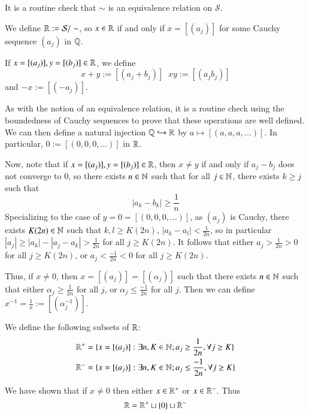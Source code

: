 It is a routine check that $\sim$ is an equivalence relation on $\mathcal{S}$. 

\begin{definition}
    We define $\mathbb R := \mathcal{S}/\sim$, so $x \in \mathbb R$ if and only if $x = [(a_j)]$ for some Cauchy sequence $(a_j)$ in $\mathbb Q$.
\end{definition}

\begin{definition}
    If $x = [(a_j)], y = [(b_j)] \in \mathbb R$, we define $$x+y := [(a_j+b_j)]\;\;xy := [(a_jb_j)]$$ and $-x := [(-a_j)]$.
\end{definition}

As with the notion of an equivalence relation, it is a routine check using the boundedness of Cauchy sequences to prove that these operations are well defined. We can then define a natural injection $\mathbb Q\hookrightarrow \mathbb R$ by $a\mapsto [(a,a,a,...)]$. In particular, $0:= [(0,0,0,...)]$ in $\mathbb R$. 

Now, note that if $x = [(a_j)], y = [(b_j)] \in \mathbb R$, then $x \neq y$ if and only if $a_j-b_j$ does not converge to $0$, so there exists $n \in \mathbb N$ such that for all $j \in \mathbb N$, there exists $k \geq j$ such that $$|a_k - b_k| \geq \frac{1}{n}$$ Specializing to the case of $y = 0=[(0,0,0,...)]$, as $(a_j)$ is Cauchy, there exists $K(2n) \in \mathbb N$ such that $k,l \geq K(2n)$, $|a_k - a_l| < \frac{1}{2n}$, so in particular $|a_j| \geq |a_k| - |a_j - a_k| > \frac{1}{2n}$ for all $j \geq K(2n)$. It follows that either $a_j > \frac{1}{2n} > 0$ for all $j \geq K(2n)$, or $a_j < \frac{-1}{2n} < 0$ for all $j \geq K(2n)$.

Thus, if $x \neq 0$, then $x = [(a_j)] = [(\alpha_j)]$ such that there exists $n \in \mathbb N$ such that either $\alpha_j \geq \frac{1}{2n}$ for all $j$, or $\alpha_j \leq \frac{-1}{2n}$ for all $j$. Then we can define $x^{-1} = \frac{1}{x} := [(\alpha_j^{-1})]$.

\begin{definition}
    We define the following subsets of $\mathbb R$: \begin{align*}
        \mathbb R^+ &= \{x = [(a_j)]: \exists n,K \in \mathbb N;a_j\geq \frac{1}{2n},\forall j \geq K\} \\
        \mathbb R^- &= \{x = [(a_j)]: \exists n,K \in \mathbb N; a_j \leq \frac{-1}{2n},\forall j\geq K\}
    \end{align*}
\end{definition}
We have shown that if $x \neq 0$ then either $x \in \mathbb R^+$ or $x \in \mathbb R^-$. Thus $$\mathbb R = \mathbb R^+ \sqcup \{0\}\sqcup \mathbb R^-$$


